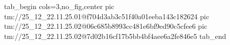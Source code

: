  
 
 
 
 

\qqSecOrig


\ifcmt
  tab_begin cols=3,no_fig,center
    pic tm://25_12_22.11.25.01@f704d3ab3c51f40a01eeba143c182624
    pic tm://25_12_22.11.25.02@06c685b8993cc481e6bf9ed90c5cfee6
    pic tm://25_12_22.11.25.02@7d02b16cf17b5bb4bf4aee6a2fe846e5
  tab_end
\fi

